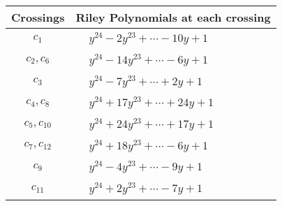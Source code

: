 \documentclass[1p]{elsarticle_modified}
\theoremstyle{definition}
\begin{document}
\begin{tabular}{m{50pt}|m{274pt}}
Crossings & \hspace{64pt}Riley Polynomials at each crossing \\
\hline $$\begin{aligned}c_{1}\end{aligned}$$&$\begin{aligned}
&y^{24}-2 y^{23}+\cdots-10 y+1
\end{aligned}$\\
\hline $$\begin{aligned}c_{2},c_{6}\end{aligned}$$&$\begin{aligned}
&y^{24}-14 y^{23}+\cdots-6 y+1
\end{aligned}$\\
\hline $$\begin{aligned}c_{3}\end{aligned}$$&$\begin{aligned}
&y^{24}-7 y^{23}+\cdots+2 y+1
\end{aligned}$\\
\hline $$\begin{aligned}c_{4},c_{8}\end{aligned}$$&$\begin{aligned}
&y^{24}+17 y^{23}+\cdots+24 y+1
\end{aligned}$\\
\hline $$\begin{aligned}c_{5},c_{10}\end{aligned}$$&$\begin{aligned}
&y^{24}+24 y^{23}+\cdots+17 y+1
\end{aligned}$\\
\hline $$\begin{aligned}c_{7},c_{12}\end{aligned}$$&$\begin{aligned}
&y^{24}+18 y^{23}+\cdots-6 y+1
\end{aligned}$\\
\hline $$\begin{aligned}c_{9}\end{aligned}$$&$\begin{aligned}
&y^{24}-4 y^{23}+\cdots-9 y+1
\end{aligned}$\\
\hline $$\begin{aligned}c_{11}\end{aligned}$$&$\begin{aligned}
&y^{24}+2 y^{23}+\cdots-7 y+1
\end{aligned}$\\
\hline
\end{tabular}\\~\\
\end{document}
